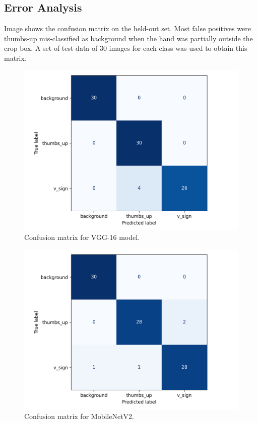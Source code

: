 \documentclass[a4paper,12pt]{article}
\begin{document}
\subsection{Error Analysis}
Image shows the confusion matrix on the held-out
set. Most false positives were thumbs-up mis-classified as background
when the hand was partially outside the crop box. A set of test data of 30 images for each class was used to obtain this matrix.

\begin{figure}[H]
  \centering
  \graphicspath{{confu/}}
  \includegraphics[width=0.55\linewidth]{cm_gestures.png}
  \caption{Confusion matrix for VGG-16 model.}
  \label{fig:confusion}
\end{figure}

\begin{figure}[H]
  \centering
  \graphicspath{{confu/}}
  \includegraphics[width=0.55\linewidth]{cm_mobilenet_gestures.png}
  \caption{Confusion matrix for  MobileNetV2.}
  \label{fig:confusion2}
\end{figure}
\end{document}
